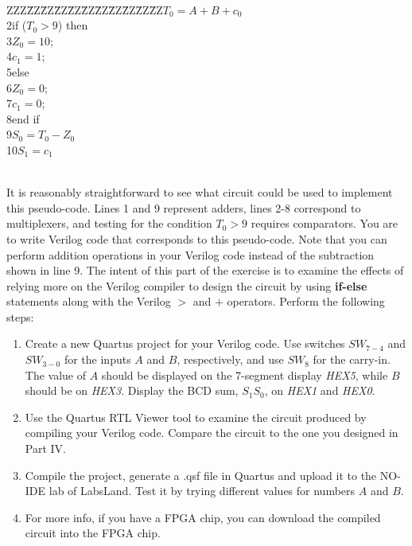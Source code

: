 \documentclass[epsfig,10pt,fullpage]{article}
\begin{document}
~\\
\begin{center}
\begin{minipage}[t]{12.5 cm}
\begin{tabbing}
ZZZ\=ZZ\=ZZ\=ZZ\=ZZ\=ZZ\=ZZ\=ZZ\=ZZ\=ZZ\=ZZ\>$T_0 = A + B + c_0$ \\
2\>if ($T_0 > 9$) then\\
3\>\>$Z_0 = 10$;\\
4\>\>$c_1 = 1$;\\
5\>else\\
6\>\>$Z_0 = 0$;\\
7\>\>$c_1 = 0$;\\
8\>end if\\
9\>$S_0 = T_0 - Z_0$\\
10\>$S_1 = c_1$\\
\end{tabbing}
\end{minipage}
\end{center}
~\\
It is reasonably straightforward to see what circuit could be used to implement this
pseudo-code. Lines 1 and 9 represent adders, lines 2-8 correspond to
multiplexers, and testing for the condition $T_0 > 9$ requires comparators.
You are to write Verilog code that corresponds to this pseudo-code. Note that you can
perform addition operations in your Verilog code instead of the subtraction shown 
in line 9. The intent of this part of the exercise is
to examine the effects of relying more on the Verilog compiler to design the circuit by using
{\bf if-else} statements along with the Verilog $>$ and $+$ operators. 
Perform the following steps:

\begin{enumerate}
\item Create a new Quartus project for your Verilog code. Use switches $SW_{7-4}$ and $SW_{3-0}$ for the inputs $A$ and $B$, respectively, and
use $SW_{8}$ for the carry-in.
The value of $A$ should be displayed on the 7-segment display {\it HEX5}, 
while $B$ should be on {\it HEX3}.
Display the BCD sum, $S_1 S_0$, on {\it HEX1} and {\it HEX0}.
\item Use the Quartus RTL Viewer tool to examine the circuit produced by compiling your
Verilog code. Compare the circuit to the one you designed in Part IV.
\item Compile the project, generate a .qsf file in Quartus and upload it to the NO-IDE lab of LabsLand. Test it by trying different values for 
numbers $A$ and $B$.
\item For more info, if you have a FPGA chip, you can download the compiled circuit into the FPGA chip.
\end{enumerate}
\end{document}
